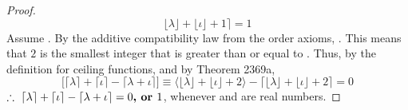 \documentclass[preview]{standalone}
\begin{document}
\begin{proof}
\begin{equation*}
            \lfloor \lambda \rfloor 
                + 
            \lfloor \iota \rfloor 
                + 
            1
        \Big \rceil
            = 
        1
    \end{equation*} 
     Assume 
    . 
    By the additive compatibility law from the order axioms,
    . 
    This means that $2$ is the smallest integer that is greater than or equal to
    .
    Thus, by the definition for ceiling functions, 
    and by Theorem 2369a,
    \begin{equation*}
        \Big[ 
            \lceil \lambda \rceil 
                + 
            \lceil \iota \rceil 
                - 
            \lceil \lambda + \iota \rceil 
        \Big]
            \equiv
        \Big \langle \lfloor \lambda \rfloor + \lfloor \iota \rfloor + 2 \Big \rangle
            - 
        \Big \lceil
            \lfloor \lambda \rfloor 
                + 
            \lfloor \iota \rfloor 
                + 
            2
        \Big \rceil
            = 
        0
    \end{equation*} 
    $\therefore \text{\space} \relax{
        \lceil \lambda \rceil 
            + 
        \lceil \iota \rceil 
            - 
        \lceil \lambda + \iota \rceil 
            = 
        0
            \textbf{, or } 
        1
    }$, whenever \bm{$\lambda$} and \bm{$\iota$} are real 
    numbers.
\end{proof}
\end{document}
